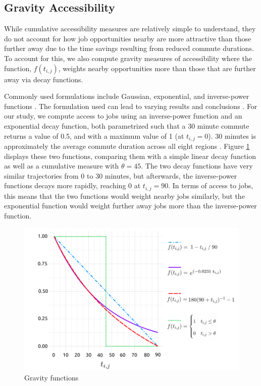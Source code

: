 \documentclass[11 pt, letterpaper]{article}
\begin{document}
{\subsection{Gravity Accessibility}

While cumulative accessibility measures are relatively simple to understand, they do not account for how job opportunities nearby are more attractive than those further away due to the time savings resulting from reduced commute durations. To account for this, we also compute gravity measures of accessibility where the function, $f(t_{i,j})$, weights nearby opportunities more than those that are further away via decay functions.

Commonly used formulations include Gaussian, exponential, and inverse-power functions \cite{handy1997,osullivan2000}. The formulation used can lead to varying results and conclusions \cite{guy1983,kwan1998}. For our study, we compute access to jobs using an inverse-power function and an exponential decay function, both parametrized such that a 30 minute commute returns a value of 0.5, and with a maximum value of 1 (at $t_{i,j} = 0$). 30 minutes is approximately the average commute duration across all eight regions \cite{sc2016}. Figure \ref{gravity} displays these two functions, comparing them with a simple linear decay function as well as a cumulative measure with $\theta = 45$. The two decay functions have very similar trajectories from 0 to 30 minutes, but afterwards, the inverse-power functions decays more rapidly, reaching 0 at $t_{i,j} = 90$. In terms of access to jobs, this means that the two functions would weight nearby jobs similarly, but the exponential function would weight further away jobs more than the inverse-power function. 

\begin{figure}[H]
	\vspace{4mm}
	\caption{Gravity functions} 
	\label{gravity}
	\centerline{\includegraphics[width=5in]{figures/gravity/gravity.pdf}}
	\vspace{2mm}
\end{figure}



}
\end{document}
